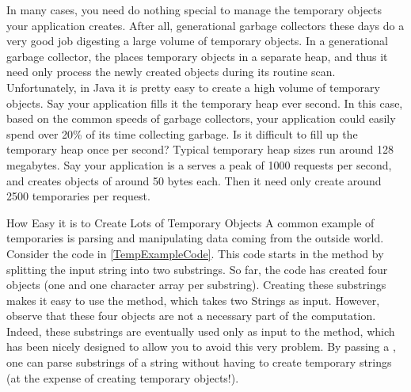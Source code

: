 In many cases, you need do nothing special to manage the temporary objects your
application creates. After all, generational garbage collectors these days do a
very good job digesting a large volume of temporary objects. In a generational
garbage collector, the \jre places temporary objects in a separate heap, and
thus it need only process the newly created objects during its routine scan.
Unfortunately, in Java it is pretty easy to create a high volume of temporary
objects. Say your application 
fills it the temporary heap ever second. In this case, based on the common
speeds of garbage collectors, your application could easily spend over 20\% of its time
collecting garbage.
Is it difficult to fill up the temporary heap once per second? Typical
temporary heap sizes run around 128 megabytes. Say your application is a serves
a peak of 1000 requests per second, and creates objects of around 50 bytes each.
Then it need only create around 2500 temporaries per request. 



\begin{example}{How Easy it is to Create Lots of Temporary Objects}
A common example of temporaries is parsing
and manipulating data coming from the outside world. 
Consider the code in \autoref{TempExampleCode}. This code starts in
the  method by splitting the input string into two substrings. So
far, the code has created four objects (one  and one character
array per substring). 
Creating these substrings makes it easy to use the  method, which
takes two Strings as input. However, observe
that these four objects are not a necessary part of the computation. Indeed,
these substrings are eventually used only as input to the
  method, which has been nicely designed to
allow you to avoid this very problem. By passing a , one
can parse substrings of a string without having to create temporary strings (at
the expense of creating temporary  objects!).
\end{example}



